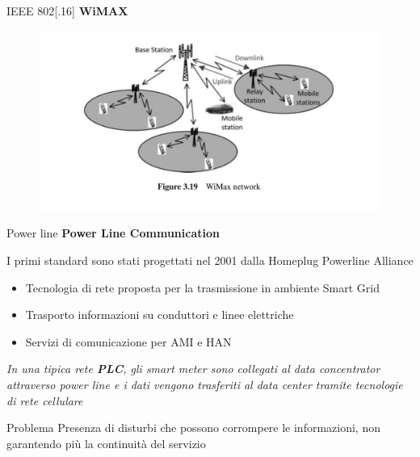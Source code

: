 \begin{frame}{IEEE 802[.16]}
	\textbf{WiMAX}
	\begin{figure}[h]
		\includegraphics[scale=0.3,cfbox=blue_slides 1pt 0pt]{imgs/wim.png}
	\end{figure}
\end{frame}

\begin{frame}{Power line}
	\textbf{Power Line Communication}
	\begin{block}{}
	I primi standard sono stati progettati nel 2001 dalla Homeplug Powerline Alliance
	\end{block}
	\pause
	\begin{itemize}[<+- | alert@+>]
		\item Tecnologia di rete proposta per la trasmissione in ambiente Smart Grid
		\item Trasporto informazioni su conduttori e linee elettriche %
		\item Servizi di comunicazione per AMI e HAN
	\end{itemize}
	\pause
	\begin{block}{}
		\textit{In una tipica rete \textbf{\color{blue_slides}PLC}, gli smart meter sono collegati al data concentrator attraverso power line e i dati vengono trasferiti al data center tramite tecnologie di rete cellulare}
	\end{block}
	\pause
	\begin{block}{Problema}
		Presenza di disturbi che possono corrompere le informazioni, non garantendo più la continuità del servizio
	\end{block}
\end{frame}

